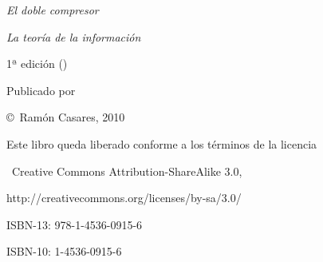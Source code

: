 \vfill
 {\sl El doble compresor}\par
 {\sl La teoría de la información}\par
 1ª edición (\todayiso)\par
 \null\par
 Publicado por \par
 \copyright\ Ramón Casares, 2010\par
 Este libro queda liberado conforme a los términos de la licencia\par
 \ccbysa\ {\sf Creative Commons Attribution-ShareAlike 3.0},\par
     {http://creativecommons.org/licenses/by-sa/3.0/}\par
 \null\par
 ISBN-13: 978-1-4536-0915-6\par
 ISBN-10: 1-4536-0915-6\par

\break %

\null
\vskip5pc
\begingroup\it
\vskip3pc
\endgroup
\vfil
\break

\null\vfill\break %

\endinput
